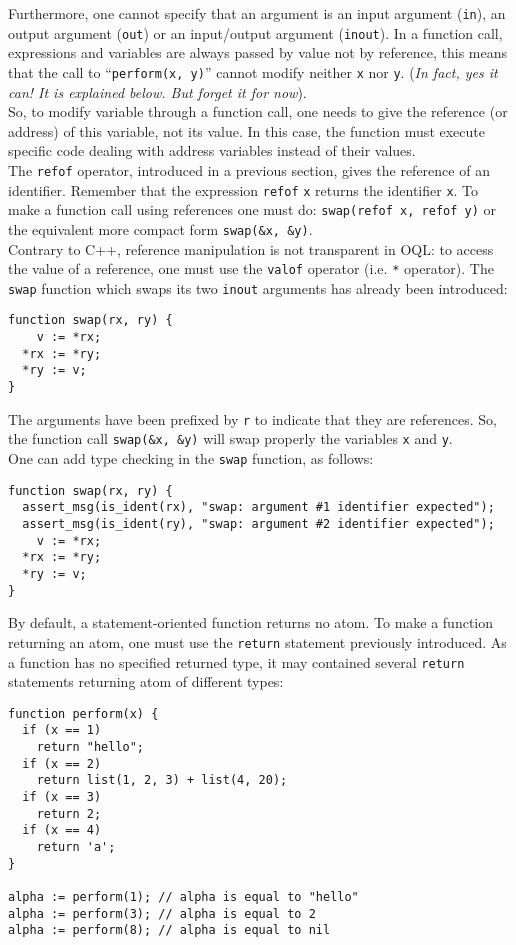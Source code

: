 Furthermore, one cannot specify that an argument is an input
argument (\texttt{in}), an output argument (\texttt{out}) or
an input/output argument (\texttt{inout}).
In a function call, expressions and variables are always passed
by value not by reference, this means that the call to
``\texttt{perform(x, y)}'' cannot modify neither \texttt{x} nor \texttt{y}.
(\emph{In fact, yes it can! It is explained below. But forget it for now}).\\
So, to modify variable through a function call, one needs to give the
reference (or address) of this variable, not its value.
In this case, the function must execute specific code dealing with
address variables instead of their values.\\
The \texttt{refof} operator, introduced in a previous section, gives
the reference of an identifier.
Remember that the expression \texttt{refof} \texttt{x} returns
the identifier \texttt{x}.
To make a function call using references one must do:
\texttt{swap(refof x, refof y)} or
the equivalent more compact form \texttt{swap(\&x, \&y)}.\\
Contrary to C++, reference manipulation is not transparent in OQL:
to access the value of a reference, one must use the \texttt{valof} operator
(i.e. \texttt{*} operator).
The \texttt{swap} function which swaps its two \texttt{inout} arguments
has already been introduced:
\begin{verbatim}
function swap(rx, ry) {
    v := *rx;
  *rx := *ry;
  *ry := v;
}
\end{verbatim}
The arguments have been prefixed by \texttt{r} to
indicate that they are references.
So, the function call \texttt{swap(\&x, \&y)} will swap properly
the variables \texttt{x} and \texttt{y}.\\
One can add type checking in the \texttt{swap} function, as follows:
\begin{verbatim}
function swap(rx, ry) {
  assert_msg(is_ident(rx), "swap: argument #1 identifier expected");
  assert_msg(is_ident(ry), "swap: argument #2 identifier expected");
    v := *rx;
  *rx := *ry;
  *ry := v;
}
\end{verbatim}

By default, a statement-oriented function returns no atom. To make a
function returning an atom, one must use the \texttt{return} statement
previously introduced. As a function has no specified returned
type, it may contained several \texttt{return} statements returning
atom of different types:
\begin{verbatim}
function perform(x) {
  if (x == 1)
    return "hello";
  if (x == 2)
    return list(1, 2, 3) + list(4, 20);
  if (x == 3)
    return 2;
  if (x == 4)
    return 'a';
}

alpha := perform(1); // alpha is equal to "hello"
alpha := perform(3); // alpha is equal to 2
alpha := perform(8); // alpha is equal to nil
\end{verbatim}

